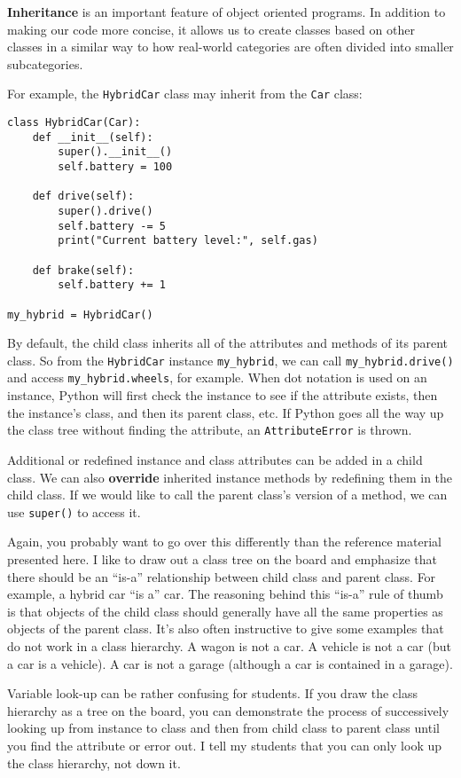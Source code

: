 \textbf{Inheritance} is an important feature of object oriented programs. In addition to making our code more concise, it allows us to create classes based on other classes in a similar way to how real-world categories are often divided into smaller subcategories. 

For example, the \lstinline{HybridCar} class may inherit from the \lstinline{Car} class: 

\begin{lstlisting}
class HybridCar(Car):
    def __init__(self):
        super().__init__()
        self.battery = 100

    def drive(self):
        super().drive()
        self.battery -= 5
        print("Current battery level:", self.gas)

    def brake(self):
        self.battery += 1

my_hybrid = HybridCar()
\end{lstlisting}

By default, the child class inherits all of the attributes and methods of its parent class. So from the \lstinline{HybridCar} instance \lstinline{my_hybrid}, we can call \lstinline{my_hybrid.drive()} and access \lstinline{my_hybrid.wheels}, for example. When dot notation is used on an instance, Python will first check the instance to see if the attribute exists, then the instance's class, and then its parent class, etc. If Python goes all the way up the class tree without finding the attribute, an \lstinline{AttributeError} is thrown. 

Additional or redefined instance and class attributes can be added in a child class. We can also \textbf{override} inherited instance methods by redefining them in the child class. If we would like to call the parent class's version of a method, we can use \lstinline{super()} to access it. 

\begin{meta}
Again, you probably want to go over this differently than the reference material presented here. I like to draw out a class tree on the board and emphasize that there should be an ``is-a'' relationship between child class and parent class. For example, a hybrid car ``is a'' car. The reasoning behind this ``is-a'' rule of thumb is that objects of the child class should generally have all the same properties as objects of the parent class. It's also often instructive to give some examples that do not work in a class hierarchy. A wagon is not a car. A vehicle is not a car (but a car is a vehicle). A car is not a garage (although a car is contained in a garage). 

Variable look-up can be rather confusing for students. If you draw the class hierarchy as a tree on the board, you can demonstrate the process of successively looking up from instance to class and then from child class to parent class until you find the attribute or error out. I tell my students that you can only look up the class hierarchy, not down it. 
\end{meta}